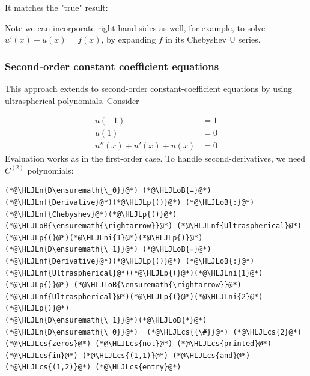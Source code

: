 \documentclass[12pt,a4paper]{article}
\newcommand{\HLJLn}[1]{#1}
\newcommand{\HLJLnf}[1]{\textcolor[RGB]{66,102,213}{#1}}
\newcommand{\HLJLni}[1]{\textcolor[RGB]{59,151,46}{#1}}
\newcommand{\HLJLoB}[1]{\textcolor[RGB]{102,102,102}{\textbf{#1}}}
\newcommand{\HLJLp}[1]{#1}
\newcommand{\HLJLcs}[1]{\textcolor[RGB]{153,153,119}{\textit{#1}}}
\begin{document}
It matches the "true" result:

Note we can incorporate right-hand sides as well, for example, to solve $u'(x) - u(x) = f(x)$, by expanding $f$ in its Chebyshev U series.

\subsubsection{Second-order constant coefficient equations}
This approach extends to second-order constant-coefficient equations by using ultraspherical polynomials.  Consider


\begin{align*}
u(-1) &= 1\\
u(1) &= 0\\
u''(x) + u'(x)  + u(x) &= 0
\end{align*}
Evaluation works as in the first-order case. To handle second-derivatives, we need $C^{(2)}$ polynomials:


\begin{lstlisting}
(*@\HLJLn{D\ensuremath{\_0}}@*) (*@\HLJLoB{=}@*) (*@\HLJLnf{Derivative}@*)(*@\HLJLp{()}@*) (*@\HLJLoB{:}@*) (*@\HLJLnf{Chebyshev}@*)(*@\HLJLp{()}@*) (*@\HLJLoB{\ensuremath{\rightarrow}}@*) (*@\HLJLnf{Ultraspherical}@*)(*@\HLJLp{(}@*)(*@\HLJLni{1}@*)(*@\HLJLp{)}@*)
(*@\HLJLn{D\ensuremath{\_1}}@*) (*@\HLJLoB{=}@*) (*@\HLJLnf{Derivative}@*)(*@\HLJLp{()}@*) (*@\HLJLoB{:}@*) (*@\HLJLnf{Ultraspherical}@*)(*@\HLJLp{(}@*)(*@\HLJLni{1}@*)(*@\HLJLp{)}@*) (*@\HLJLoB{\ensuremath{\rightarrow}}@*) (*@\HLJLnf{Ultraspherical}@*)(*@\HLJLp{(}@*)(*@\HLJLni{2}@*)(*@\HLJLp{)}@*)
(*@\HLJLn{D\ensuremath{\_1}}@*)(*@\HLJLoB{*}@*)(*@\HLJLn{D\ensuremath{\_0}}@*)  (*@\HLJLcs{{\#}}@*) (*@\HLJLcs{2}@*) (*@\HLJLcs{zeros}@*) (*@\HLJLcs{not}@*) (*@\HLJLcs{printed}@*) (*@\HLJLcs{in}@*) (*@\HLJLcs{(1,1)}@*) (*@\HLJLcs{and}@*) (*@\HLJLcs{(1,2)}@*) (*@\HLJLcs{entry}@*)
\end{lstlisting}
\end{document}
